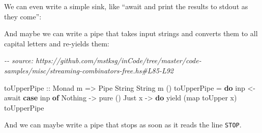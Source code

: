 \documentclass[]{article}
\newenvironment{Shaded}{}{}
\newcommand{\CommentTok}[1]{\textcolor[rgb]{0.38,0.63,0.69}{\textit{#1}}}
\newcommand{\DataTypeTok}[1]{\textcolor[rgb]{0.56,0.13,0.00}{#1}}
\newcommand{\FunctionTok}[1]{\textcolor[rgb]{0.02,0.16,0.49}{#1}}
\newcommand{\KeywordTok}[1]{\textcolor[rgb]{0.00,0.44,0.13}{\textbf{#1}}}
\newcommand{\NormalTok}[1]{#1}
\newcommand{\OperatorTok}[1]{\textcolor[rgb]{0.40,0.40,0.40}{#1}}
\newcommand{\OtherTok}[1]{\textcolor[rgb]{0.00,0.44,0.13}{#1}}
\begin{document}
We can even write a simple sink, like ``await and print the results to stdout as
they come'':

\begin{Shaded}
\end{Shaded}

And maybe we can write a pipe that takes input strings and converts them to all
capital letters and re-yields them:

\begin{Shaded}
\begin{Highlighting}[]
\CommentTok{{-}{-} source: https://github.com/mstksg/inCode/tree/master/code{-}samples/misc/streaming{-}combinators{-}free.hs\#L85{-}L92}

\OtherTok{toUpperPipe ::} \DataTypeTok{Monad}\NormalTok{ m }\OtherTok{=>} \DataTypeTok{Pipe} \DataTypeTok{String} \DataTypeTok{String}\NormalTok{ m ()}
\NormalTok{toUpperPipe }\OtherTok{=} \KeywordTok{do}
\NormalTok{    inp }\OtherTok{<{-}}\NormalTok{ await}
    \KeywordTok{case}\NormalTok{ inp }\KeywordTok{of}
      \DataTypeTok{Nothing} \OtherTok{{-}>} \FunctionTok{pure}\NormalTok{ ()}
      \DataTypeTok{Just}\NormalTok{ x  }\OtherTok{{-}>} \KeywordTok{do}
\NormalTok{        yield (}\FunctionTok{map} \FunctionTok{toUpper}\NormalTok{ x)}
\NormalTok{        toUpperPipe}
\end{Highlighting}
\end{Shaded}

And we can maybe write a pipe that stops as soon as it reads the line
\texttt{STOP}.
\end{document}
